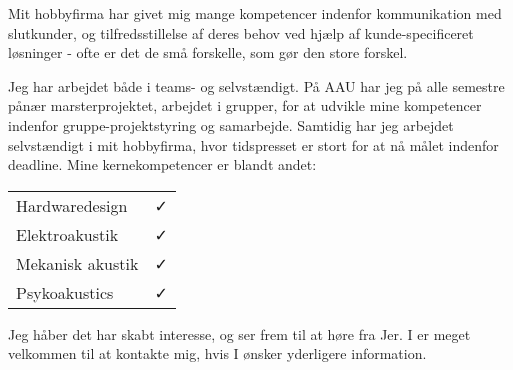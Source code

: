 \documentclass{my_application}
\begin{document}
Mit hobbyfirma har givet mig mange kompetencer indenfor kommunikation med slutkunder, og tilfredsstillelse af deres behov ved hjælp af kunde-specificeret løsninger - ofte er det de små forskelle, som gør den store forskel.

Jeg har arbejdet både i teams- og selvstændigt. På AAU har jeg på alle semestre pånær marsterprojektet, arbejdet i grupper, for at udvikle mine kompetencer indenfor gruppe-projektstyring og samarbejde. Samtidig har jeg arbejdet selvstændigt i mit hobbyfirma, hvor tidspresset er stort for at nå målet indenfor deadline. 
\skipline
%
Mine kernekompetencer er blandt andet:
\begin{table}[!ht]
	\begin{tabular}{l c}
		Hardwaredesign & \faCheck \\
		Elektroakustik & \faCheck \\
		Mekanisk akustik & \faCheck\\
		Psykoakustics & \faCheck
	\end{tabular}
\end{table}
%
\skipline
%
Jeg håber det har skabt interesse, og ser frem til at høre fra Jer. 
\newline
\newline
I er meget velkommen til at kontakte mig, hvis I ønsker yderligere information.
\skipline
%	
\end{document}
